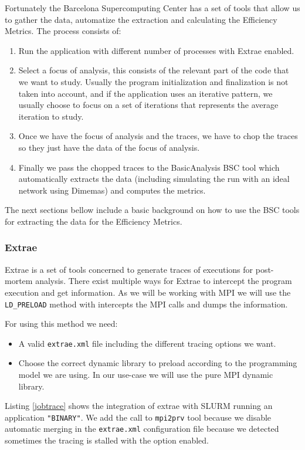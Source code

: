 \noindent
Fortunately the Barcelona Supercomputing Center has a set of tools that allow us to gather the data, automatize the extraction and calculating the Efficiency Metrics. The process consists of:
\begin{enumerate}
  \item Run the application with different number of processes with Extrae enabled.
  \item Select a focus of analysis, this consists of the relevant part of the code that we want to study. Usually the program initialization and finalization is not taken into account, and if the application uses an iterative pattern, we usually choose to focus on a set of iterations that represents the average iteration to study.
  \item Once we have the focus of analysis and the traces, we have to chop the traces so they just have the data of the focus of analysis.
  \item Finally we pass the chopped traces to the BasicAnalysis BSC tool which automatically extracts the data (including simulating the run with an ideal network using Dimemas) and computes the metrics. 
\end{enumerate}

The next sections bellow include a basic background on how to use the BSC tools for extracting the data for the Efficiency Metrics.

\subsubsection{Extrae}\label{extrae}

Extrae\cite{extrae} is a set of tools concerned to generate traces of executions for post-mortem analysis. There exist multiple ways for Extrae to intercept the program execution and get information. As we will be working with MPI we will use the \texttt{LD\_PRELOAD} method with intercepts the MPI calls and dumps the information.

For using this method we need:
\begin{itemize}
  \item A valid \texttt{extrae.xml} file including the different tracing options we want. 
  \item Choose the correct dynamic library to preload according to the programming model we are using. In our use-case we will use the pure MPI dynamic library. 
\end{itemize}

\noindent
Listing \ref{jobtrace} shows the integration of extrae with SLURM running an application \texttt{"BINARY"}. We add the call to \texttt{mpi2prv} tool because we disable automatic merging in the \texttt{extrae.xml} configuration file because we detected sometimes the tracing is stalled with the option enabled.

